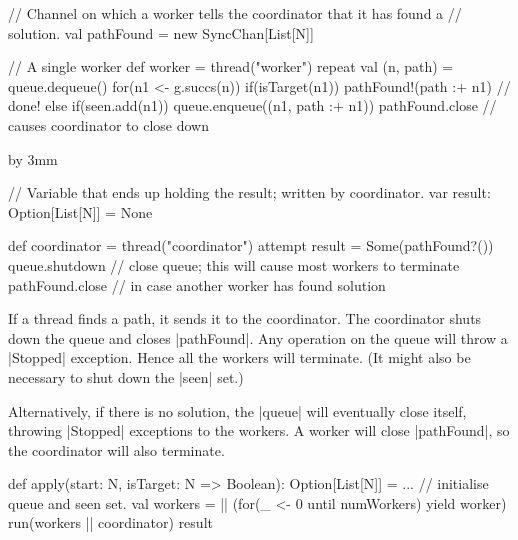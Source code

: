 
\begin{slide}

\begin{scala}
    // Channel on which a worker tells the coordinator that it has found a
    // solution.
    val pathFound = new SyncChan[List[N]]

    // A single worker
    def worker = thread("worker"){
      repeat{
        val (n, path) = queue.dequeue()
        for(n1 <- g.succs(n)){
          if(isTarget(n1)) pathFound!(path :+ n1) // done!
          else if(seen.add(n1)) queue.enqueue((n1, path :+ n1))
        }
      }
      pathFound.close // causes coordinator to close down
    }
\end{scala}
\end{slide}


{\advance\slideheight by 3mm
\begin{slide}

\begin{scala}
    // Variable that ends up holding the result; written by coordinator. 
    var result: Option[List[N]] = None

    def coordinator = thread("coordinator"){
      attempt{ result = Some(pathFound?()) }{ }
      queue.shutdown // close queue; this will cause most workers to terminate
      pathFound.close // in case another worker has found solution
    }
\end{scala}

If a thread finds a path, it sends it to the coordinator.  The coordinator
shuts down the queue and closes |pathFound|.  Any operation on the queue will
throw a |Stopped| exception.  Hence all the workers will terminate.  (It might
also be necessary to shut down the |seen| set.)

Alternatively, if there is no solution, the |queue| will eventually close
itself, throwing |Stopped| exceptions to the workers.  A worker will close
|pathFound|, so the coordinator will also terminate. 
\end{slide}}


\begin{slide}

\begin{scala}
  def apply(start: N, isTarget: N => Boolean): Option[List[N]] = {
    ... // initialise queue and seen set.
    val workers = || (for(_ <- 0 until numWorkers) yield worker)
    run(workers || coordinator)
    result
  }
\end{scala}
\end{slide}

